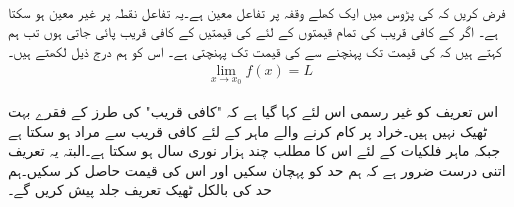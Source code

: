 \\
فرض کریں کہ  کی پڑوس میں ایک کھلے وقفہ پر تفاعل  معین ہے۔یہ تفاعل نقطہ  پر غیر معین ہو سکتا ہے۔ اگر  کے کافی قریب  کی  تمام قیمتوں کے لئے  کی قیمتیں  کے کافی قریب پائی جاتی ہوں تب ہم کہتے ہیں کہ  کی قیمت  تک پہنچنے سے  کی قیمت   تک پہنچتی ہے۔ اس کو ہم درج ذیل لکھتے ہیں۔
\begin{align*}
\lim_{x\to x_0} f(x)=L
\end{align*}

اس تعریف کو غیر رسمی اس لئے کہا گیا ہے کہ "کافی قریب" کی طرز کے فقرے بہت ٹھیک نہیں ہیں۔خراد پر کام کرنے والے ماہر کے لئے کافی قریب سے مراد  ہو سکتا ہے جبکہ ماہر فلکیات کے لئے اس کا مطلب چند ہزار نوری سال ہو سکتا ہے۔البتہ یہ تعریف اتنی درست ضرور ہے کہ ہم حد کو پہچان سکیں اور اس کی قیمت حاصل کر سکیں۔ہم حد کی بالکل ٹھیک تعریف جلد پیش کریں گے۔

